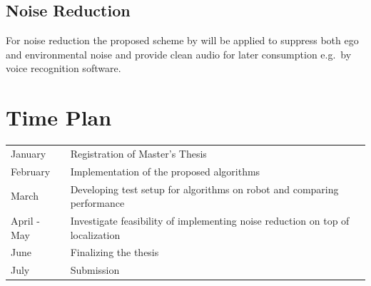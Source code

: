 \documentclass[
    fontsize=12pt,
    headings=small,
    parskip=half,           %
    bibliography=totoc,
    numbers=noenddot,       %
    open=any,               %
      final                   %
]{scrreprt}
\begin{document}
\section{Noise Reduction}
For noise reduction the proposed scheme by \textcite{nr_multi} will be applied to suppress both ego and environmental noise and provide clean audio for later consumption e.g.\ by voice recognition software.

\chapter{Time Plan}
\begin{tabularx}{\textwidth}{l X}
    January     & Registration of Master's Thesis                                                \\
    February    & Implementation of the proposed algorithms                                      \\
    March       & Developing test setup for algorithms on robot and comparing performance        \\
    April - May & Investigate feasibility of implementing noise reduction on top of localization \\
    June        & Finalizing the thesis                                                          \\
    July        & Submission
\end{tabularx}

\begin{raggedright}         %
    \printbibliography        %
\end{raggedright}

\listoftodos
\end{document}
